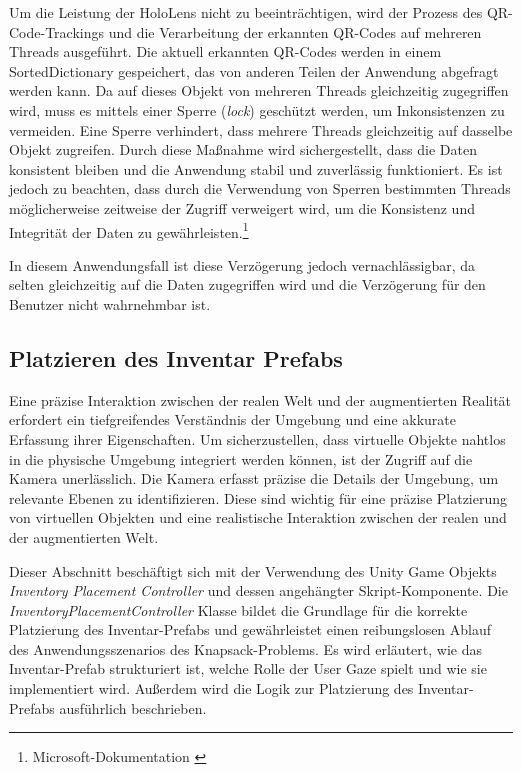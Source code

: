 \begin{itemize}
Um die Leistung der HoloLens nicht zu beeinträchtigen, wird der Prozess des QR-Code-Trackings und die Verarbeitung der erkannten QR-Codes auf mehreren Threads ausgeführt. Die aktuell erkannten QR-Codes werden in einem SortedDictionary gespeichert, das von anderen Teilen der Anwendung abgefragt werden kann. Da auf dieses Objekt von mehreren Threads gleichzeitig zugegriffen wird, muss es mittels einer Sperre (\textit{lock}) geschützt werden, um Inkonsistenzen zu vermeiden. Eine Sperre verhindert, dass mehrere Threads gleichzeitig auf dasselbe Objekt zugreifen. Durch diese Maßnahme wird sichergestellt, dass die Daten konsistent bleiben und die Anwendung stabil und zuverlässig funktioniert. Es ist jedoch zu beachten, dass durch die Verwendung von Sperren bestimmten Threads möglicherweise zeitweise der Zugriff verweigert wird, um die Konsistenz und Integrität der Daten zu gewährleisten.\footnote{Microsoft-Dokumentation \cite{Lock-Statement}}

In diesem Anwendungsfall ist diese Verzögerung jedoch vernachlässigbar, da selten gleichzeitig auf die Daten zugegriffen wird und die Verzögerung für den Benutzer nicht wahrnehmbar ist.


\subsection{Platzieren des Inventar Prefabs}
Eine präzise Interaktion zwischen der realen Welt und der augmentierten Realität erfordert ein tiefgreifendes Verständnis
der Umgebung und eine akkurate Erfassung ihrer Eigenschaften. Um sicherzustellen, dass virtuelle Objekte nahtlos in die
physische Umgebung integriert werden können, ist der Zugriff auf die Kamera unerlässlich. Die Kamera erfasst präzise die
Details der Umgebung, um relevante Ebenen zu identifizieren. Diese sind wichtig für eine präzise Platzierung von virtuellen
Objekten und eine realistische Interaktion zwischen der realen und der augmentierten Welt.

Dieser Abschnitt beschäftigt sich mit der Verwendung des Unity Game Objekts \textit{Inventory Placement Controller} und
dessen angehängter Skript-Komponente. Die \textit{InventoryPlacementController} Klasse bildet die Grundlage für die korrekte
Platzierung des Inventar-Prefabs und gewährleistet einen reibungslosen Ablauf des Anwendungsszenarios des Knapsack-Problems.
Es wird erläutert, wie das Inventar-Prefab strukturiert ist, welche Rolle der User Gaze spielt und wie sie implementiert
wird. Außerdem wird die Logik zur Platzierung des Inventar-Prefabs ausführlich beschrieben.


\end{itemize}
